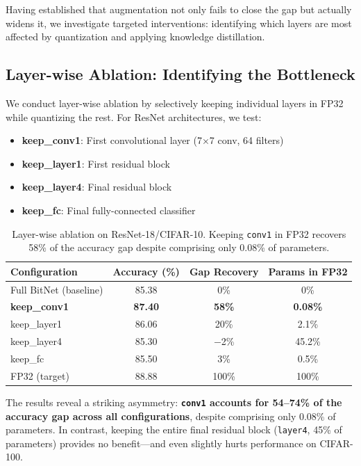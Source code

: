 \documentclass[10pt]{article}
\begin{document}
Having established that augmentation not only fails to close the gap but actually widens it, we investigate targeted interventions: identifying which layers are most affected by quantization and applying knowledge distillation.

\subsection{Layer-wise Ablation: Identifying the Bottleneck}

We conduct layer-wise ablation by selectively keeping individual layers in FP32 while quantizing the rest. For ResNet architectures, we test:
\begin{itemize}
    \item \textbf{keep\_conv1}: First convolutional layer (7$\times$7 conv, 64 filters)
    \item \textbf{keep\_layer1}: First residual block
    \item \textbf{keep\_layer4}: Final residual block
    \item \textbf{keep\_fc}: Final fully-connected classifier
\end{itemize}

\begin{table}[ht]
\centering
\caption{Layer-wise ablation on ResNet-18/CIFAR-10. Keeping \texttt{conv1} in FP32 recovers 58\% of the accuracy gap despite comprising only 0.08\% of parameters.}
\label{tab:ablation}
\begin{tabular}{lccc}
\toprule
Configuration & Accuracy (\%) & Gap Recovery & Params in FP32 \\
\midrule
Full BitNet (baseline) & 85.38 & 0\% & 0\% \\
\textbf{keep\_conv1}   & \textbf{87.40} & \textbf{58\%} & \textbf{0.08\%} \\
keep\_layer1           & 86.06 & 20\% & 2.1\% \\
keep\_layer4           & 85.30 & $-$2\% & 45.2\% \\
keep\_fc               & 85.50 & 3\% & 0.5\% \\
\midrule
FP32 (target)          & 88.88 & 100\% & 100\% \\
\bottomrule
\end{tabular}
\end{table}

The results reveal a striking asymmetry: \textbf{\texttt{conv1} accounts for 54--74\% of the accuracy gap across all configurations}, despite comprising only 0.08\% of parameters. In contrast, keeping the entire final residual block (\texttt{layer4}, 45\% of parameters) provides no benefit---and even slightly hurts performance on CIFAR-100.
\end{document}
